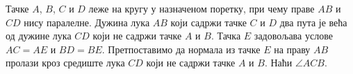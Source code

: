 \problem
Тачке $A$, $B$, $C$ и $D$ леже на кругу у назначеном поретку, при чему праве
$AB$ и $CD$ нису паралелне.
Дужина лука $AB$ који садржи тачке $C$ и $D$ два пута је већа од дужине лука
$CD$ који не садржи тачке $A$ и $B$.
Тачка $E$ задовољава услове $AC = AE$ и $BD = BE$.
Претпоставимо да нормала из тачке $E$ на праву $AB$ пролази кроз средиште лука
$CD$ који не садржи тачке $A$ и $B$.
Наћи $\angle ACB$.

\solution

\endproblem

